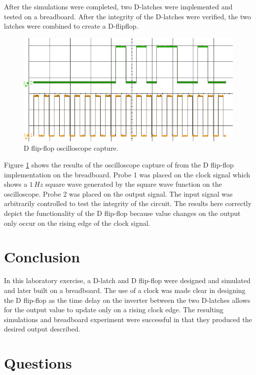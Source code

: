 \documentclass[CMPE]{KGCOEReport}
\begin{document}
After the simulations were completed, two D-latches were implemented and tested on a breadboard. After the integrity of the D-latches were verified, the two latches were combined to create a D-flipflop.

\begin{figure}[h!]
	\centering
	\includegraphics[width=\textwidth]{scope_p0.png}
	\caption{D flip-flop oscilloscope capture.}
	\label{fig:dosc}
\end{figure}

Figure \ref{fig:dosc} shows the results of the oscilloscope capture of from the D flip-flop implementation on the breadboard. Probe 1 was placed on the clock signal which shows a $1\,Hz$ square wave generated by the square wave function on the oscilloscope. Probe 2 was placed on the output signal. The input signal was arbitrarily controlled to  test the integrity of the circuit. The results here correctly depict the functionality of the D flip-flop because value changes on the output only occur on the rising edge of the clock signal.

\section*{Conclusion}

In this laboratory exercise, a D-latch and D flip-flop were designed and simulated and later built on a breadboard. The use of a clock was made clear in designing the D flip-flop as the time delay on the inverter between the two D-latches allows for the output value to update only on a rising clock edge. The resulting simulations and breadboard experiment were successful in that they produced the desired output described.

\section*{Questions}
\end{document}
